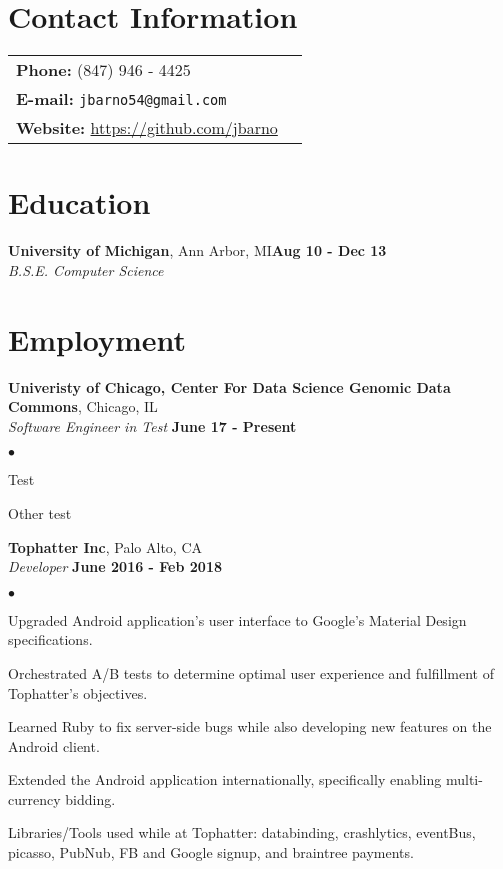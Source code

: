 \documentclass[margin,line]{res}
\newenvironment{list2}{
  \begin{list}{$\bullet$}{
      \setlength{\itemsep}{0in}
      \setlength{\parsep}{0in} \setlength{\parskip}{0in}
      \setlength{\topsep}{0in} \setlength{\partopsep}{0in} 
      \setlength{\leftmargin}{0.2in}}}{\end{list}}
\begin{document}
\address{ 5467 S Ingleside Ave}
\address{ APT 3W, Chicago IL} 

\begin{resume}

\section{\sc Contact Information}
\begin{tabular}{@{}p{3in}p{4in}}
{\bf Phone:}   (847) 946 - 4425\\
{\bf E-mail:}  {\tt jbarno54@gmail.com} \\
{\bf Website:} \url{https://github.com/jbarno} \\
\end{tabular}


\section{\sc Education}
{\bf University of Michigan}, Ann Arbor, MI\hfill {\bf Aug 10  - Dec 13}\\
    {\em B.S.E. Computer Science}


\section{\sc Employment}
    {\bf Univeristy of Chicago, Center For Data Science Genomic Data Commons}, Chicago, IL\\
    {\em Software Engineer in Test} \hfill {\bf  June 17 - Present}\\

  \begin{list2}
    \item Test
    \item Other test
  \end{list2}
    {\bf Tophatter Inc}, Palo Alto, CA\\
    {\em Developer} \hfill {\bf June 2016 - Feb 2018}\\
  \begin{list2}
    \item  Upgraded Android application’s user interface to Google’s Material Design specifications. 
    \item  Orchestrated A/B tests to determine optimal user experience and fulfillment of Tophatter’s objectives. 
    \item  Learned Ruby to fix server-side bugs while also developing new features on the Android client.
    \item  Extended the Android application internationally, specifically enabling multi-currency bidding.
    \item  Libraries/Tools used while at Tophatter: databinding, crashlytics, eventBus, picasso, PubNub, FB and Google signup, and braintree payments. 
  \end{list2}


\end{resume}
\end{document}

